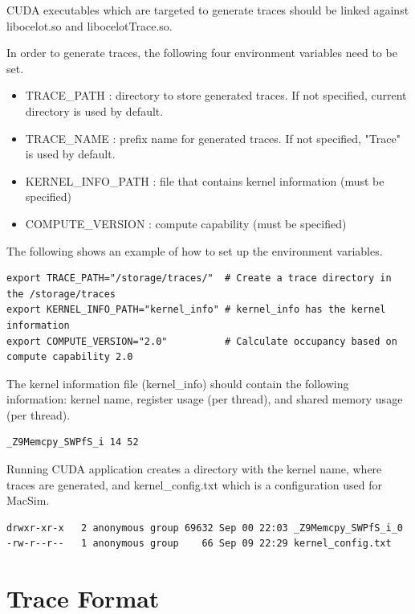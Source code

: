 CUDA executables which are targeted to generate traces should be linked against
libocelot.so and libocelotTrace.so.

In order to generate traces, the following four environment variables need to be set.

\begin{itemize}\itemsep2pt
\item TRACE\_PATH : directory to store generated traces. If not specified, current directory is used by default.
\item TRACE\_NAME : prefix name for generated traces. If not specified, "Trace" is used by default.
\item KERNEL\_INFO\_PATH : file that contains kernel information (must be specified)
\item COMPUTE\_VERSION : compute capability (must be specified)
\end{itemize}

The following shows an example of how to set up the environment variables.


\begin{Verbatim}
export TRACE_PATH="/storage/traces/"  # Create a trace directory in the /storage/traces
export KERNEL_INFO_PATH="kernel_info" # kernel_info has the kernel information
export COMPUTE_VERSION="2.0"          # Calculate occupancy based on compute capability 2.0
\end{Verbatim}


The kernel information file (kernel\_info) should contain the following
information: kernel name, register usage (per thread), and shared memory usage
(per thread).


\begin{Verbatim}
_Z9Memcpy_SWPfS_i 14 52 
\end{Verbatim}


Running CUDA application creates a directory with the kernel name, where traces 
are generated, and kernel\_config.txt which is a configuration used for MacSim.


\begin{Verbatim}
drwxr-xr-x   2 anonymous group 69632 Sep 00 22:03 _Z9Memcpy_SWPfS_i_0
-rw-r--r--   1 anonymous group    66 Sep 09 22:29 kernel_config.txt
\end{Verbatim}



\section{Trace Format}
\label{sec:traceformat}

